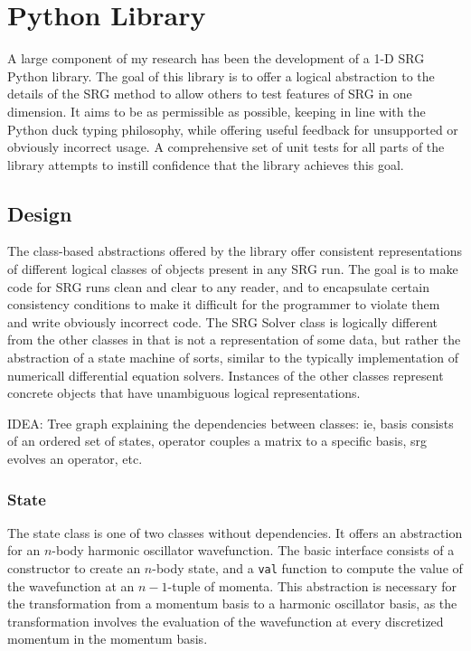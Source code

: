 \chapter{Python Library}

A large component of my research has been the development of a 1-D SRG Python library. The goal of this library is to offer a logical abstraction to the details of the SRG method to allow others to test features of SRG in one dimension. It aims to be as permissible as possible, keeping in line with the Python duck typing philosophy, while offering useful feedback for unsupported or obviously incorrect usage. A comprehensive set of unit tests for all parts of the library attempts to instill confidence that the library achieves this goal.

\section{Design}

The class-based abstractions offered by the library offer consistent representations of different logical classes of objects present in any SRG run. The goal is to make code for SRG runs clean and clear to any reader, and to encapsulate certain consistency conditions to make it difficult for the programmer to violate them and write obviously incorrect code. The SRG Solver class is logically different from the other classes in that is not a representation of some data, but rather the abstraction of a state machine of sorts, similar to the typically implementation of numericall differential equation solvers. Instances of the other classes represent concrete objects that have unambiguous logical representations.

IDEA: Tree graph explaining the dependencies between classes: ie, basis consists of an ordered set of states, operator couples a matrix to a specific basis, srg evolves an operator, etc.

\subsection{State}

The state class is one of two classes without dependencies. It offers an abstraction for an $n$-body harmonic oscillator wavefunction. The basic interface consists of a constructor to create an $n$-body state, and a \texttt{val} function to compute the value of the wavefunction at an $n-1$-tuple of momenta. This abstraction is necessary for the transformation from a momentum basis to a harmonic oscillator basis, as the transformation involves the evaluation of the wavefunction at every discretized momentum in the momentum basis.

